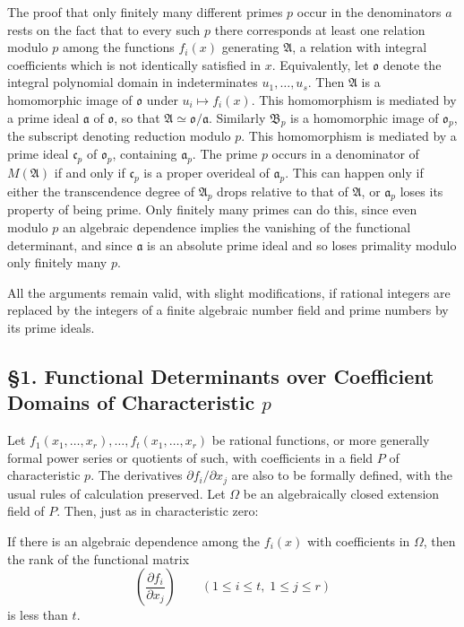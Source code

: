 \documentclass[11pt]{article}
\providecommand{\frakA}{\mathfrak A}
\providecommand{\frakB}{\mathfrak B}
\providecommand{\frako}{\mathfrak o}
\providecommand{\fraka}{\mathfrak a}
\providecommand{\frakc}{\mathfrak c}
\begin{document}
The proof that only finitely many different primes \(p\) occur in the denominators \(a\) rests on the fact that to every such \(p\) there corresponds at least one relation modulo \(p\) among the functions \(f_i(x)\) generating \(\frakA\), a relation with integral coefficients which is not identically satisfied in \(x\). Equivalently, let \(\frako\) denote the integral polynomial domain in indeterminates \(u_1,\ldots,u_s\). Then \(\frakA\) is a homomorphic image of \(\frako\) under \(u_i\mapsto f_i(x)\). This homomorphism is mediated by a prime ideal \(\fraka\) of \(\frako\), so that \(\frakA\simeq \frako/\fraka\). Similarly \(\frakB_p\) is a homomorphic image of \(\frako_p\), the subscript denoting reduction modulo \(p\). This homomorphism is mediated by a prime ideal \(\frakc_p\) of \(\frako_p\), containing \(\fraka_p\). The prime \(p\) occurs in a denominator of \(M(\frakA)\) if and only if \(\frakc_p\) is a proper overideal of \(\fraka_p\). This can happen only if either the transcendence degree of \(\frakA_p\) drops relative to that of \(\frakA\), or \(\fraka_p\) loses its property of being prime. Only finitely many primes can do this, since even modulo \(p\) an algebraic dependence implies the vanishing of the functional determinant, and since \(\fraka\) is an absolute prime ideal and so loses primality modulo only finitely many \(p\).

All the arguments remain valid, with slight modifications, if rational integers are replaced by the integers of a finite algebraic number field and prime numbers by its prime ideals.

\subsection*{§1. Functional Determinants over Coefficient Domains of Characteristic \(p\)}

Let \(f_1(x_1,\ldots,x_r),\ldots,f_t(x_1,\ldots,x_r)\) be rational functions, or more generally formal power series or quotients of such, with coefficients in a field \(P\) of characteristic \(p\). The derivatives \(\partial f_i/\partial x_j\) are also to be formally defined, with the usual rules of calculation preserved. Let \(\Omega\) be an algebraically closed extension field of \(P\). Then, just as in characteristic zero:

If there is an algebraic dependence among the \(f_i(x)\) with coefficients in \(\Omega\), then the rank of the functional matrix
\[
        \left(\frac{\partial f_i}{\partial x_j}\right)
        \qquad (1\le i\le t,\;1\le j\le r)
\]
is less than \(t\).
\end{document}
